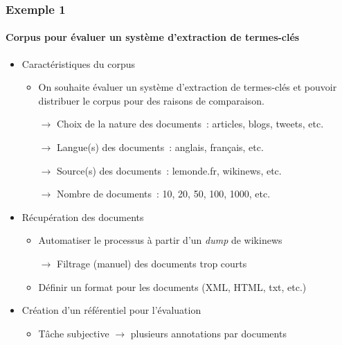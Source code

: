\begin{frame}
\frametitle{Exemple 1}
\framesubtitle{Corpus pour évaluer un système d'extraction de termes-clés}

\begin{itemize} \itemsep10pt
    \item Caractéristiques du corpus
    \begin{itemize}
        \item On souhaite évaluer un système d'extraction de termes-clés et 
              pouvoir distribuer le corpus pour des raisons de comparaison.
        \item[$\to$] Choix de la nature des documents~: \alert{articles}, blogs,
                     tweets, etc.
        \item[$\to$] Langue(s) des documents~: anglais, \alert{français}, etc.
        \item[$\to$] Source(s) des documents~: lemonde.fr, \alert{wikinews}, 
                     etc.
        \item[$\to$] Nombre de documents~: 10, 20, 50, \alert{100}, 1000, etc.
    \end{itemize}

    \item Récupération des documents
    \begin{itemize}
        \item Automatiser le processus à partir d'un \textit{dump} de wikinews
        \item[$\to$] Filtrage (manuel) des documents trop courts
        \item Définir un format pour les documents (XML, HTML, txt, etc.)
    \end{itemize}

    \item Création d'un référentiel pour l'évaluation
    \begin{itemize}
        \item Tâche subjective $\to$ plusieurs annotations par documents
    \end{itemize}

\end{itemize}

\end{frame}

